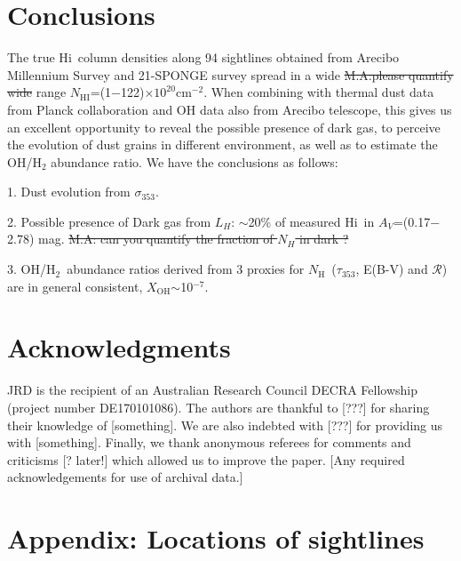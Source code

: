 \documentclass[preprint]{emulateapj}
\def\av{$A_{V}$}
\def\h2{H$_2$}
\def\hi{H{\sc i}}
\def\LH{$L_{H}$}
\def\NHI{$N_\mathrm{HI}$}
\def\NH{$N_\mathrm{H}$}
\def\s{s$^{-1}$}
\def\s353{$\sigma_{353}$}
\def\t353{$\tau_{353}$}
\def\rad{$\mathcal{R}$}
\def\xoh{$X_\mathrm{OH}$}
\begin{document}
\section{Conclusions}
\label{sec:conclusion}
The true \hi\ column densities along 94 sightlines obtained from Arecibo Millennium Survey and 21-SPONGE survey spread in a wide \sout{M.A:please quantify wide} range \NHI=(1$-$122)$\times10^{20}$cm$^{-2}$. When combining with thermal dust data from Planck collaboration and OH data also from Arecibo telescope, this gives us an excellent opportunity to reveal the possible presence of dark gas, to perceive the evolution of dust grains in different environment, as well as to estimate the OH/H$_{2}$ abundance ratio. We have the conclusions as follows:

1. Dust evolution from \s353.

2. Possible presence of Dark gas from \LH: $\sim$20\% of measured \hi\ in \av=(0.17$-$2.78) mag. \sout{M.A: can you quantify the fraction of $N_H$ in dark ?}

3. OH/\h2\ abundance ratios derived from 3 proxies for \NH\ (\t353, E(B-V) and \rad) are in general consistent, \xoh$\sim$10$^{-7}$.

\section*{Acknowledgments}
JRD is the recipient of an Australian Research Council DECRA Fellowship (project number DE170101086).
The authors are thankful to [???] for sharing their knowledge of [something]. We are also indebted with [???] for providing us with [something]. Finally, we thank anonymous referees for comments and criticisms [? later!] which allowed us to improve the paper. %
[Any required acknowledgements for use of archival data.]




\clearpage

\section*{Appendix: Locations of sightlines}
\end{document}
